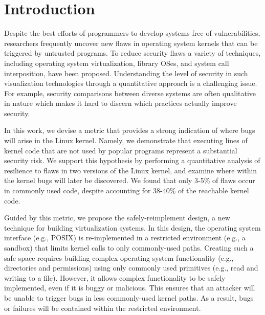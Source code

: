 \section{Introduction}
\label{sec.introduction}

Despite the best efforts of programmers to develop systems free of vulnerabilities,
researchers frequently uncover new flaws in operating system kernels that can be
triggered by untrusted programs. To reduce security flaws
a variety of techniques, including operating system virtualization, library OSes,
and system call interposition, have been proposed. Understanding the level of security in such visualization technologies through a quantitative approach is a challenging issue. For example, security comparisons between diverse systems are often qualitative in nature which makes it hard to discern which practices actually improve security.


In this work, we devise a metric that provides a strong indication of where bugs will arise in the Linux kernel. Namely, we demonstrate
that executing lines of kernel code that are not used by popular programs represent
a substantial security risk. We support this hypothesis by performing a quantitative
 analysis of resilience to flaws in two versions of the Linux kernel, and examine
where within the kernel bugs will later be discovered. We found that only 3-5\%
  of flaws occur in commonly used code, despite accounting for
 38-40\%  of the reachable kernel code.

Guided by this metric, we propose the safely-reimplement design, a new
technique for building virtualization systems. In this design, the operating
system interface (e.g., POSIX) is re-implemented in a restricted environment
(e.g., a sandbox) that limits kernel calls to only commonly-used paths.
Creating such a safe space requires building complex operating system functionality
(e.g., directories and permissions) using only commonly used primitives (e.g.,
read and writing to a file). However, it allows complex functionality to be safely
implemented, even if it is buggy or malicious. 
This ensures that an attacker will be unable to trigger bugs in less 
commonly-used kernel paths. As a result, bugs or failures
will be contained within the restricted environment.

